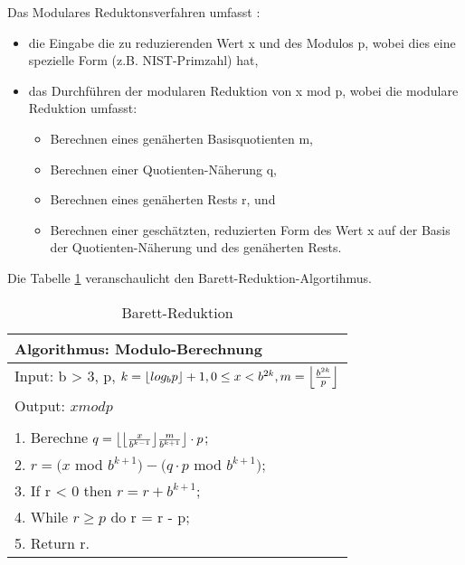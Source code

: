 Das Modulares Reduktonsverfahren umfasst \cite{patent}:
\begin{itemize}
       \item die Eingabe die zu reduzierenden Wert x und des Modulos p, wobei dies eine spezielle Form (z.B. NIST-Primzahl) hat,
       \item das Durchführen der modularen Reduktion von x mod p, wobei die modulare Reduktion umfasst:
       \begin{itemize}
         \item Berechnen eines genäherten Basisquotienten m,
         \item Berechnen einer Quotienten-Näherung q, 
         \item Berechnen eines genäherten Rests r, und
         \item Berechnen einer geschätzten, reduzierten Form des Wert x auf der Basis der Quotienten-Näherung und des genäherten Rests.
       \end{itemize}
\end{itemize}

 Die Tabelle \ref{tab3} veranschaulicht den Barett-Reduktion-Algortihmus. 



\begin{table}[!ht]
\centering
	\begin{tabular}{l}
		\toprule
		\textbf{Algorithmus: Modulo-Berechnung}\\
		\midrule
		Input: b > 3, p, $ k = \floor*{log_bp} + 1, 0 \leq x < b^{2k}, m = \floor*{\frac{b^{2k}}{p}} $\\
		Output: $ x mod p $ \\
		                                           \\
		                                           
		1. Berechne $ q = \floor*{ \floor*{\frac{x}{b^{k-1}}} \frac{m}{b^{k+1}} }\cdot p $;\\
		2. $ r = (x $ mod $ b^{k+1} ) - (q \cdot p $ mod $ b^{k+1})$;  \\
		3. If r < 0 then $ r = r + b^{k+1}$;\\ 
		4. While $ r \geq p $ do r = r - p; \\
		5. Return r. \\
	   \bottomrule
	\end{tabular}
	\caption{Barett-Reduktion\cite{nist}}
	\label{tab3}
\end{table}




